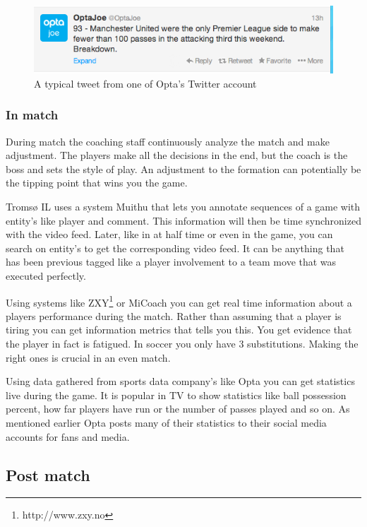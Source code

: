 \begin{figure}[ht!]
\centering
\includegraphics[width=1\textwidth]{images/general/optastats.png}
\caption{A typical tweet from one of Opta's Twitter account}
\label{fig:optastats}
\end{figure}

\subsubsection{In match}

During match the coaching staff continuously analyze the match and make adjustment. The players make all the decisions in the end, but the coach is the boss and sets the style of play. An adjustment to the formation can potentially be the tipping point that wins you the game.

Tromsø IL uses a system Muithu \cite{muithu} that lets you annotate sequences of a game with entity's like player and comment. This information will then be time synchronized with the video feed. Later, like in at half time or even in the game, you can search on entity's to get the corresponding video feed. It can be anything that has been previous tagged like a player involvement to a team move that was executed perfectly. 

Using systems like \ac{ZXY}\footnote{http://www.zxy.no} or MiCoach \cite{bigdata:majorleague} you can get real time information about a players performance during the match. Rather than assuming that a player is tiring you can get information metrics that tells you this. You get evidence that the player in fact is fatigued. In soccer you only have 3 substitutions. Making the right ones is crucial in an even match.

Using data gathered from sports data company's like Opta you can get statistics live during the game. It is popular in TV to show statistics like ball possession percent, how far players have run or the number of passes played and so on. As mentioned earlier Opta posts many of their statistics to their social media accounts for fans and media.

\subsection{Post match}

